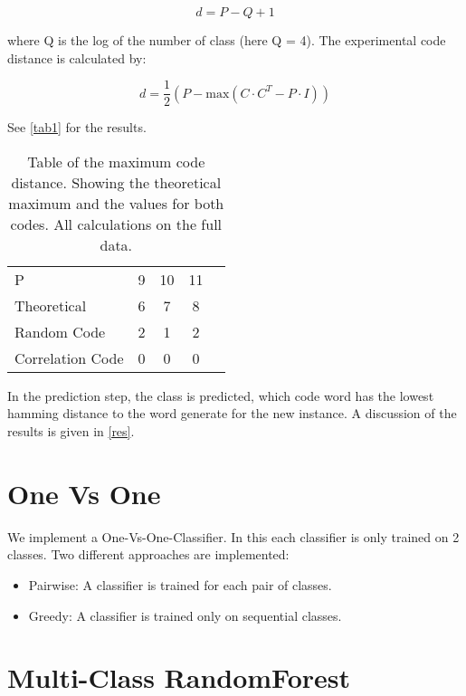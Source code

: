 \documentclass{article}
\begin{document}
\begin{equation}
    d = P - Q + 1 
\end{equation}

where Q is the log of the number of class (here Q = 4).
The experimental code distance is calculated by:

\begin{equation}
    d = \frac{1}{2} (P - \textrm{max}(C \cdot C^{T} - P \cdot I) )
\end{equation}

See \autoref{tab1} for the results. 

\begin{table}[h]
	\centering
	\begin{tabular}{l c c c c}
        P	            &	9	& 10    &   11   \\
        Theoretical	    &	6	&  7    &    8   \\
        Random Code     &   2   &  1    &    2   \\
        Correlation Code&   0   &  0    &    0   \\ 
	\end{tabular}
	\caption{Table of the maximum code distance. Showing the theoretical maximum and the values for both codes. All calculations on the full data.}
	\label{tab1}
\end{table}

In the prediction step, the class is predicted, which code word has the lowest hamming distance to the word generate for the new instance.
A discussion of the results is given in \autoref{res}.

\section{One Vs One}

We implement a One-Vs-One-Classifier. In this each classifier is only trained on 2 classes.
Two different approaches are implemented:
\begin{itemize}
    \item Pairwise: A classifier is trained for each pair of classes.
    \item Greedy: A classifier is trained only on sequential classes. 
\end{itemize}

\section{Multi-Class RandomForest}
\end{document}
